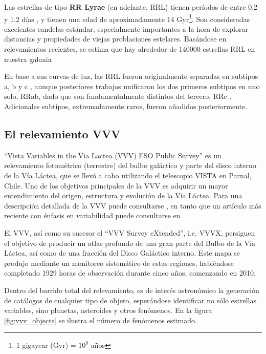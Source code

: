 \par Las estrellas de tipo \textbf{RR Lyrae} (en adelante, RRL) tienen períodos de entre 0.2 y 1.2 días \cite{smith}, y tienen una edad de aproximadamente 14 Gyr\footnote{1 gigayear (Gyr) = $10^9$ años}. Son consideradas excelentes candelas estándar, especialmente importantes a la hora de explorar distancias y propiedades de viejas problaciones estelares. Basándose en relevamientos recientes, se estima que hay alrededor de 140000 estrellas RRL en nuestra galaxia \cite{ogle} \cite{gaia} \\

\par En base a sus curvas de luz, las RRL fueron originalmente separadas en subtipos a, b y c \cite{bailey}, aunque posteriores trabajos unificaron los dos primeros subtipos en uno solo, RRab, dado que son fundamentalmente distintos del tercero, RRc \cite{schwarzschild}. Adicionales subtipos, extremadamente raros, fueron añadidos posteriormente. \\

\subsection{El relevamiento VVV}

\par ``Vista Variables in the Via Lactea (VVV) ESO Public Survey'' es un relevamiento fotométrico (terrestre) del bulbo galáctico y parte del disco interno de la Vía Láctea, que se llevó a cabo utilizando el telescopio VISTA en Parnal, Chile.  Uno de los objetivos principales de la VVV es adquirir un mayor entendimiento del origen, estructura y evolución de la Vía Láctea. Para una descripción detallada de la VVV puede consultarse \cite{vvv}, en tanto que un artículo más reciente con énfasis en variabilidad puede consultarse en \cite{vvv_actual} \\

\par El VVV, así como su sucesor el ``VVV Survey eXtended'', i.e. VVVX, persiguen el objetivo de producir un atlas profundo de una gran parte del Bulbo de la Vía Láctea, así como de una fracción del Disco Galáctico interno. Este mapa se produjo mediante un monitoreo sistemático de estas regiones, habiéndose completado 1929 horas de observación durante cinco años, comenzando en 2010. \\

\par Dentro del barrido total del relevamiento, es de interés astronómico la generación de catálogos de cualquier tipo de objeto, esperándose identificar no sólo estrellas variables, sino planetas, asteroides y otros fenómenos. En la figura \ref{fig:vvv_objects} se ilustra el número de fenómenos estimado.

